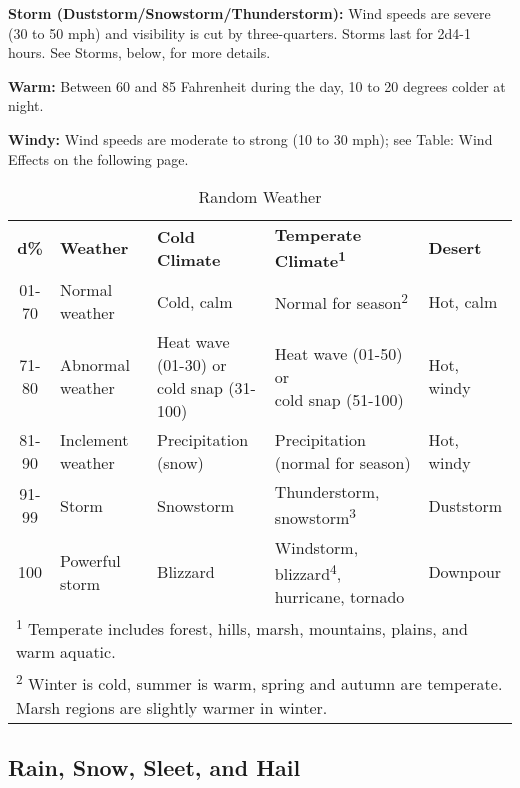 \textbf{Storm (Duststorm/Snowstorm/Thunderstorm):} Wind 
speeds are severe (30 to 50 mph) and visibility is cut by three-quarters. Storms 
last for 2d4-1 hours. See Storms, below, for more details. 

\textbf{Warm:} Between 60\textdegree{} and 85\textdegree{} Fahrenheit during the day, 10 to 20 degrees 
colder at night.

\textbf{Windy:} Wind speeds are moderate to strong (10 to 30 mph); see Table: Wind 
Effects on the following page.

\begin{table}[htb]
\caption{Random Weather}
\centering
\begin{tabular}{c l l l l}
\textbf{d\%} & \textbf{Weather} & \textbf{Cold Climate} & \textbf{Temperate Climate\textsuperscript{1}} & \textbf{Desert}\\
01-70 & Normal weather & Cold, calm & Normal for season\textsuperscript{2} & Hot, calm\\
71-80 & Abnormal weather & \shortstack{Heat wave (01-30) or\\ cold snap (31-100)} & \shortstack{Heat wave (01-50) or\\ cold snap (51-100)} & Hot, windy\\
81-90 & Inclement weather & Precipitation (snow) & Precipitation (normal for season) & Hot, windy\\
91-99 & Storm & Snowstorm & Thunderstorm, snowstorm\textsuperscript{3} & Duststorm\\
100 & Powerful storm & Blizzard & Windstorm, blizzard\textsuperscript{4}, hurricane, tornado & Downpour\\
\multicolumn{5}{l}{\textsuperscript{1} Temperate includes forest, hills, marsh, mountains, plains, and warm aquatic.}\\
\multicolumn{5}{l}{\textsuperscript{2} Winter is cold, summer is warm, spring and autumn are temperate. Marsh regions are slightly warmer in winter.}\\
\end{tabular}
\end{table}

\subsection{Rain, Snow, Sleet, and Hail}

